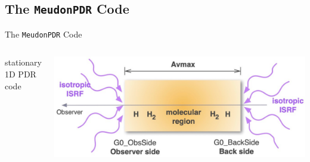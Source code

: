 \documentclass[10pt,dvipsnames,hyperref={colorlinks=false}]{beamer}
\newcommand{\mdpdr}{\texttt{MeudonPDR}}
\newcommand{\qt}[1]{}
\begin{document}
\subsection{The \mdpdr{} Code}
\begin{frame}[t]{The \mdpdr{} Code}
    \begin{columns}
        \begin{column}{.6\textwidth}
            stationary 1D PDR code
            {\small {}}
        \end{column}
        \begin{column}{.4\textwidth}
            \includegraphics[width=\textwidth,keepaspectratio]{schemePDR.pdf}
        \end{column}
    \end{columns}
    \qt{In a complex model such as the MeudonPDR code, different levels or types of approximations are possible}

\end{frame}
\end{document}

